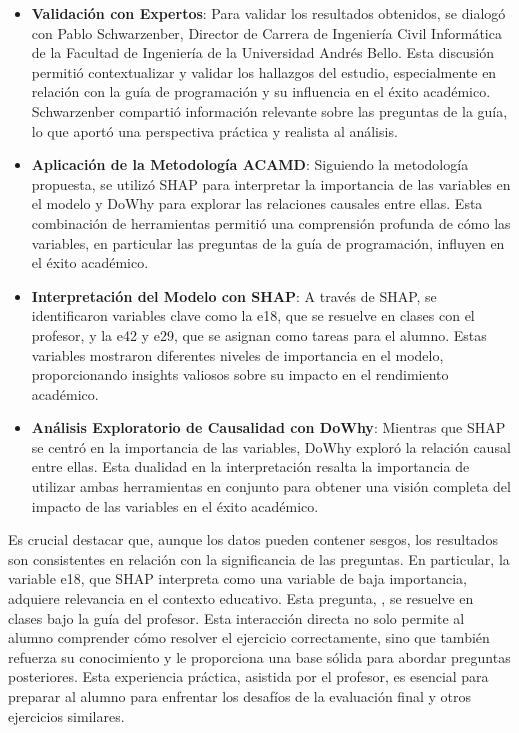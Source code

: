 \begin{itemize}
    \item \textbf{Validación con Expertos}: Para validar los resultados obtenidos, se dialogó con Pablo Schwarzenber, Director de Carrera de Ingeniería Civil Informática de la Facultad de Ingeniería de la Universidad Andrés Bello. Esta discusión permitió contextualizar y validar los hallazgos del estudio, especialmente en relación con la guía de programación y su influencia en el éxito académico. Schwarzenber compartió información relevante sobre las preguntas de la guía, lo que aportó una perspectiva práctica y realista al análisis.
    \item \textbf{Aplicación de la Metodología ACAMD}: Siguiendo la metodología propuesta, se utilizó SHAP para interpretar la importancia de las variables en el modelo y DoWhy para explorar las relaciones causales entre ellas. Esta combinación de herramientas permitió una comprensión profunda de cómo las variables, en particular las preguntas de la guía de programación, influyen en el éxito académico.
    \item \textbf{Interpretación del Modelo con SHAP}: A través de SHAP, se identificaron variables clave como la e18, que se resuelve en clases con el profesor, y la e42 y e29, que se asignan como tareas para el alumno. Estas variables mostraron diferentes niveles de importancia en el modelo, proporcionando insights valiosos sobre su impacto en el rendimiento académico.
    \item \textbf{Análisis Exploratorio de Causalidad con DoWhy}: Mientras que SHAP se centró en la importancia de las variables, DoWhy exploró la relación causal entre ellas. Esta dualidad en la interpretación resalta la importancia de utilizar ambas herramientas en conjunto para obtener una visión completa del impacto de las variables en el éxito académico.
\end{itemize}

Es crucial destacar que, aunque los datos pueden contener sesgos, los resultados son consistentes en relación con la significancia de las preguntas. En particular, la variable e18, que SHAP interpreta como una variable de baja importancia, adquiere relevancia en el contexto educativo. Esta pregunta, , se resuelve en clases bajo la guía del profesor. Esta interacción directa no solo permite al alumno comprender cómo resolver el ejercicio correctamente, sino que también refuerza su conocimiento y le proporciona una base sólida para abordar preguntas posteriores. Esta experiencia práctica, asistida por el profesor, es esencial para preparar al alumno para enfrentar los desafíos de la evaluación final y otros ejercicios similares.

